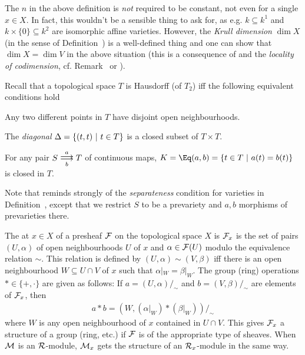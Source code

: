 \documentclass[a4paper,parskip=half,numbers=enddot, DIV=12]{scrreprt}
\begin{document}
\begin{rem}
The $n$ in the above definition is \emph{not} required to be constant, not even for a single $x\in X$. In fact, this wouldn't be a sensible thing to ask for, as e.g. $k\subseteq k^1$ and $k\times\{0\}\subseteq k^2$ are isomorphic affine varieties. However, the \emph{Krull dimension} $\dim X$ (in the sense of Definition~) is a well-defined thing and one can show that $\dim X=\dim V$ in the above situation (this is a consequence of \cite[Theorem~6]{alg1} and the \emph{locality of codimension}, cf. Remark~ or \cite[Remark~2.1.3]{alg1}).
\end{rem}
\begin{rem}
    Recall that a topological space $T$ is  Hausdorff (of $T_2$) iff the following equivalent conditions hold
    \begin{alphanumerate}
        \item 
            Any two different points in $T$ have disjoint open neighbourhoods.
        \item 
            The \emph{diagonal} $\Delta = \left\{ (t,t)\ \middle|\  t\in T\right\}$ is a closed subset of $T\times T$.
        \item 
            For any pair $S\doublemorphism[a][\smash{b}] T$ of continuous maps, $K = \Eq(a,b) =\left\{t\in T\st a(t) = b(t)\right\}$ is closed in $T$.
    \end{alphanumerate}
    Note that  reminds strongly of the \emph{separateness} condition for varieties in Definition~, except that we restrict $S$ to be a prevariety and $a,b$ morphisms of prevarieties there.
\end{rem}
\begin{defi}[Stalk]
    The  at $x\in X$ of a presheaf $\mathcal{F}$ on the topological space $X$ is $\mathcal{F}_x$ is the set of pairs $(U,\alpha)$ of open neighbourhoods $U$ of $x$ and $\alpha\in \mathcal{F}(U)$ modulo the equivalence relation $\sim$. This relation is defined by $(U,\alpha)\sim (V, \beta)$ iff there is an open neighbourhood $W\subseteq U\cap V$ of $x$ such that $\alpha|_W = \beta|_W$. The group (ring) operations $*\in \{+,\cdot\}$ are given as follows: If $a= (U,\alpha)/_\sim$ and $b= (V,\beta)/_\sim$ are elements of $\mathcal{F}_x$, then 
    \begin{align*}
        a* b = (W, (\alpha|_W)*(\beta|_W))/_\sim
    \end{align*}
    where $W$ is any open neighbourhood of $x$ contained in $U\cap V$. This gives $\mathcal{F}_x$ a structure of a group (ring, etc.) if $\mathcal{F}$ is of the appropriate type of sheaves. When $\mathcal{M}$ is an $\mathcal{R}$-module, $\mathcal{M}_x$ gets the structure of an $\mathcal{R}_x$-module in the same way.
\end{defi}
\end{document}
